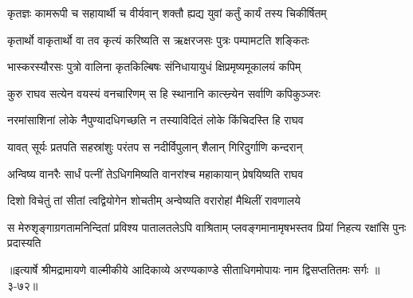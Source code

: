 \twolineshloka
{कृतज्ञः कामरूपी च सहायार्थी च वीर्यवान्}
{शक्तौ ह्यद्य युवां कर्तुं कार्यं तस्य चिकीर्षितम्} %

\twolineshloka
{कृतार्थो वाकृतार्थो वा तव कृत्यं करिष्यति}
{स ऋक्षरजसः पुत्रः पम्पामटति शङ्कितः} %

\twolineshloka
{भास्करस्यौरसः पुत्रो वालिना कृतकिल्बिषः}
{संनिधायायुधं क्षिप्रमृष्यमूकालयं कपिम्} %

\twolineshloka
{कुरु राघव सत्येन वयस्यं वनचारिणम्}
{स हि स्थानानि कात्स्न्र्येन सर्वाणि कपिकुञ्जरः} %

\twolineshloka
{नरमांसाशिनां लोके नैपुण्यादधिगच्छति}
{न तस्याविदितं लोके किंचिदस्ति हि राघव} %

\twolineshloka
{यावत् सूर्यः प्रतपति सहस्रांशुः परंतप}
{स नदीर्विपुलान् शैलान् गिरिदुर्गाणि कन्दरान्} %

\twolineshloka
{अन्विष्य वानरैः सार्धं पत्नीं तेऽधिगमिष्यति}
{वानरांश्च महाकायान् प्रेषयिष्यति राघव} %

\twolineshloka
{दिशो विचेतुं तां सीतां त्वद्वियोगेन शोचतीम्}
{अन्वेष्यति वरारोहां मैथिलीं रावणालये} %

\twolineshloka
{स मेरुशृङ्गाग्रगतामनिन्दितां प्रविश्य पातालतलेऽपि वाश्रिताम्}
{प्लवङ्गमानामृषभस्तव प्रियां निहत्य रक्षांसि पुनः प्रदास्यति} %


॥इत्यार्षे श्रीमद्रामायणे वाल्मीकीये आदिकाव्ये अरण्यकाण्डे सीताधिगमोपायः नाम द्विसप्ततितमः सर्गः ॥३-७२॥
